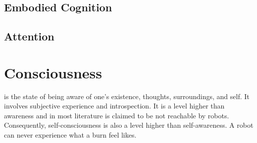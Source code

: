            


    \subsection{Embodied Cognition}

    \subsection{Attention}

    

\section{Consciousness} is the state of being aware of one’s existence, thoughts, surroundings, and self. It involves subjective experience and introspection. It is a level higher than awareness and in most literature is claimed to be not reachable by robots. Consequently, self-consciousness is also a level higher than self-awareness. A robot can never experience what a burn feel likes. 
